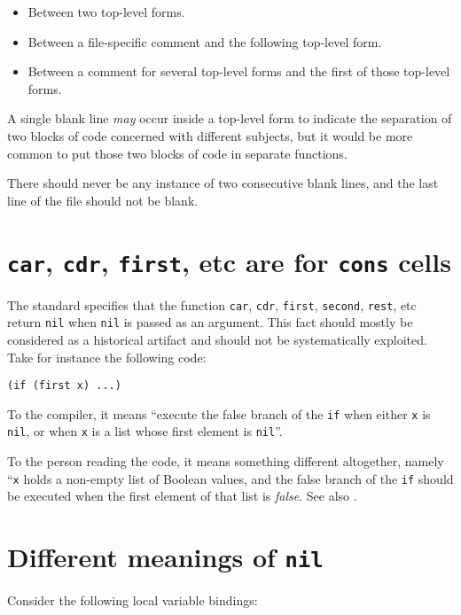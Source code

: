 \begin{itemize}
\item Between two top-level forms.
\item Between a file-specific comment and the following top-level
  form.
\item Between a comment for several top-level forms and the first
  of those top-level forms.
\end{itemize}

A single blank line \emph{may} occur inside a top-level form to
indicate the separation of two blocks of code concerned with different
subjects, but it would be more common to put those two blocks of code
in separate functions.

There should never be any instance of two consecutive blank lines, and
the last line of the file should not be blank.

\section{\texttt{car}, \texttt{cdr}, \texttt{first}, etc are for
  \texttt{cons} cells}

The \commonlisp{} standard specifies that the function \texttt{car},
\texttt{cdr}, \texttt{first}, \texttt{second}, \texttt{rest}, etc
return \texttt{nil} when \texttt{nil} is passed as an argument.  This
fact should mostly be considered as a historical artifact and should
not be systematically exploited.  Take for instance the following
code:

\begin{verbatim}
(if (first x) ...)
\end{verbatim}

To the compiler, it means ``execute the false branch of the \texttt{if}
when either \texttt{x} is \texttt{nil}, or when \texttt{x} is a list
whose first element is \texttt{nil}''.

To the person reading the code, it means something different
altogether, namely ``\texttt{x} holds a non-empty list of Boolean
values, and the false branch of the \texttt{if} should be executed
when the first element of that list is
\emph{false}. See also .

\section{Different meanings of \texttt{nil}}
\label{sec-coding-style-meanings-of-nil}

Consider the following local variable bindings:

